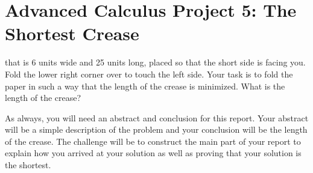 \documentclass
[justified,nohyper]
{tufte-handout}
\theoremstyle{mydef}
\begin{document}
\section{Advanced Calculus Project 5: The Shortest Crease}
 that is 6 units wide and 25 units long, placed so that the short side is facing you. Fold the lower right corner over to touch the left side. Your task is to fold the paper in such a way that the length of the crease is minimized. What is the length of the crease?

As always, you will need an abstract and conclusion for this report. Your abstract will be a simple description of the problem and your conclusion will be the length of the crease. The challenge will be to construct the main part of your report to explain how you arrived at your solution as well as proving that your solution is the shortest.
\end{document}
